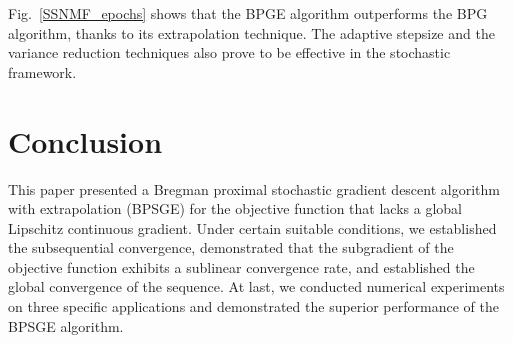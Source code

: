 \documentclass[letterpaper]{article} %
\begin{document}
	
	Fig.~\ref{SSNMF_epochs} shows that the BPGE algorithm outperforms the BPG algorithm, thanks to its extrapolation technique. The adaptive stepsize and the variance reduction techniques also prove to be effective in the stochastic framework. 
	
	
	
	
	
	
	\section{Conclusion}\label{conclusion}
	This paper presented a Bregman proximal stochastic gradient descent algorithm with extrapolation (BPSGE) for the objective function that  
	lacks a global Lipschitz continuous gradient.  Under certain suitable conditions, we established the subsequential convergence, demonstrated that the subgradient of the objective function exhibits a sublinear convergence rate, and established the global convergence of the sequence. At last, we conducted numerical experiments on three specific applications and demonstrated the superior performance of the BPSGE algorithm. 
	
	
\end{document}
